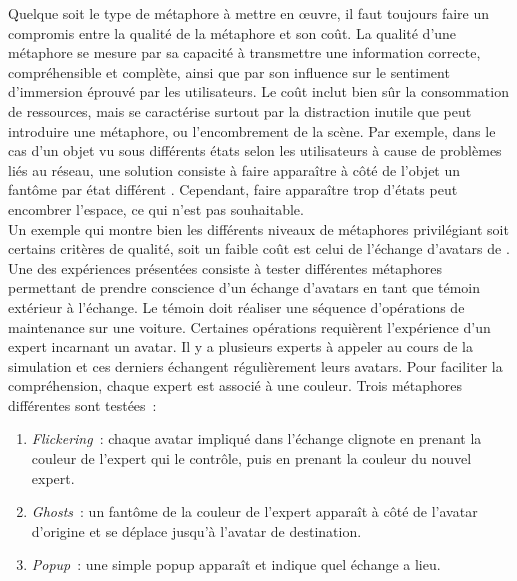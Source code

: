 \documentclass[11pt]{article}
\begin{document}
Quelque soit le type de métaphore à mettre en œuvre, il faut toujours faire un compromis entre la qualité de la métaphore et son coût. La qualité d'une métaphore se mesure par sa capacité à transmettre une information correcte, compréhensible et complète, ainsi que par son influence sur le sentiment d'immersion éprouvé par les utilisateurs. Le coût inclut bien sûr la consommation de ressources, mais se caractérise surtout par la distraction inutile que peut introduire une métaphore, ou l'encombrement de la scène. Par exemple, dans le cas d'un objet vu sous différents états selon les utilisateurs à cause de problèmes liés au réseau, une solution consiste à faire apparaître à côté de l'objet un fantôme par état différent \cite{survey}. Cependant, faire apparaître trop d'états peut encombrer l'espace, ce qui n'est pas souhaitable.
\\

Un exemple qui montre bien les différents niveaux de métaphores privilégiant soit certains critères de qualité, soit un faible coût est celui de l'échange d'avatars de \cite{avatars}. Une des expériences présentées consiste à tester différentes métaphores permettant de prendre conscience d'un échange d'avatars en tant que témoin extérieur à l'échange. Le témoin doit réaliser une séquence d'opérations de maintenance sur une voiture. Certaines opérations requièrent l'expérience d'un expert incarnant un avatar. Il y a plusieurs experts à appeler au cours de la simulation et ces derniers échangent régulièrement leurs avatars. Pour faciliter la compréhension, chaque expert est associé à une couleur. Trois métaphores différentes sont testées~:
\begin{enumerate}
	\item \textit{Flickering}~: chaque avatar impliqué dans l'échange clignote en prenant la couleur de l'expert qui le contrôle, puis en prenant la couleur du nouvel expert.
	\item \textit{Ghosts}~: un fantôme de la couleur de l'expert apparaît à côté de l'avatar d'origine et se déplace jusqu'à l'avatar de destination.
	\item \textit{Popup}~: une simple popup apparaît et indique quel échange a lieu.
\end{enumerate}
\end{document}
